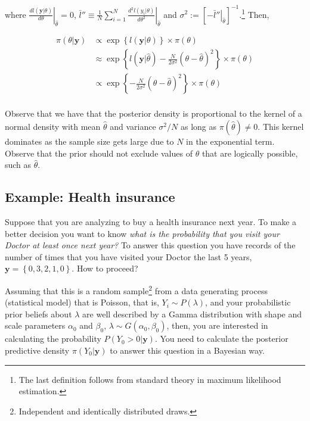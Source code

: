 where $\left.\frac{dl(\mathbf{y}|\theta)}{d\theta}\right\vert_{\hat{\theta}}=0$, $\bar{l}''\equiv\frac{1}{N}\left.\sum_{i=1}^N\frac{d^2l(y_i|{\theta})}{d\theta^2}\right\vert_{\hat{\theta}}$ and $\sigma^2:=\left[\left.-\bar{l}''\right\vert_{\hat{\theta}}\right]^{-1}$.\footnote{The last definition follows from standard theory in maximum likelihood estimation.} Then,

\begin{align*}
	\pi(\theta|\mathbf{y})&\propto \exp\left\{{l}(\mathbf{y}|\theta)\right\} \times \pi(\theta)\\
	&\approx \exp\left\{l(\mathbf{y}|\hat{\theta})-\frac{N}{2\sigma^2}(\theta-\hat{\theta})^2\right\} \times \pi(\theta)\\
	&\propto \exp\left\{-\frac{N}{2\sigma^2}(\theta-\hat{\theta})^2\right\} \times \pi(\theta)\\ 
\end{align*}

Observe that we have that the posterior density is proportional to the kernel of a normal density with mean $\hat{\theta}$ and variance $\sigma^2/N$ as long as $\pi(\hat{\theta})\neq 0$. This kernel dominates as the sample size gets large due to $N$ in the exponential term. Observe that the prior should not exclude values of $\theta$ that are logically possible, such as $\hat{\theta}$.

\subsection{Example: Health insurance}\label{sec121}

Suppose that you are analyzing to buy a health insurance next year. To make a better decision you want to know \textit{what is the probability that you visit your Doctor at least once next year?} To answer this question you have records of the number of times that you have visited your Doctor the last 5 years, $\mathbf{y}=\left\{0, 3, 2, 1, 0\right\}$. How to proceed?

Assuming that this is a random sample\footnote{Independent and identically distributed draws.} from a data generating process (statistical model) that is Poisson, that is, $Y_i\sim P(\lambda)$, and your probabilistic prior beliefs about $\lambda$ are well described by a Gamma distribution with shape and scale parameters $\alpha_0$ and $\beta_0$, $\lambda\sim G(\alpha_0, \beta_0)$, then, you are interested in calculating the probability $P(Y_0>0|\mathbf{y})$. You need to calculate the posterior predictive density $\pi(Y_0|\mathbf{y})$ to answer this question in a Bayesian way.

